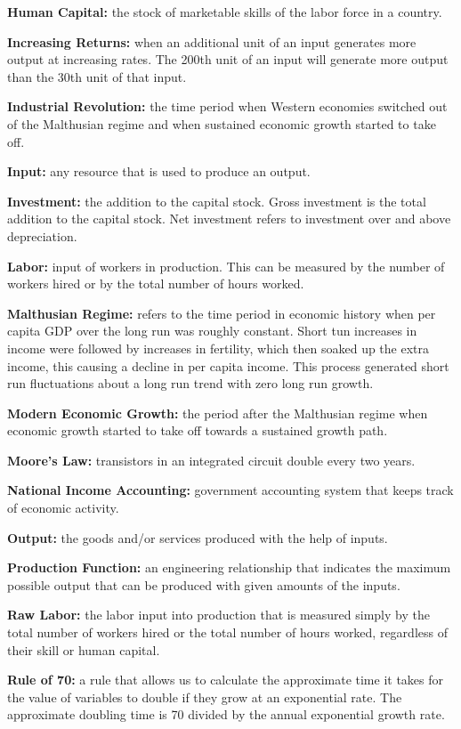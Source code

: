 \documentclass[
]{book}
\begin{document}
\textbf{Human Capital:} the stock of marketable skills of the labor force in a country.

\textbf{Increasing Returns:} when an additional unit of an input generates more output at increasing rates. The 200th unit of an input will generate more output than the 30th unit of that input.

\textbf{Industrial Revolution:} the time period when Western economies switched out of the Malthusian regime and when sustained economic growth started to take off.

\textbf{Input:} any resource that is used to produce an output.

\textbf{Investment:} the addition to the capital stock. Gross investment is the total addition to the capital stock. Net investment refers to investment over and above depreciation.

\textbf{Labor:} input of workers in production. This can be measured by the number of workers hired or by the total number of hours worked.

\textbf{Malthusian Regime:} refers to the time period in economic history when per capita GDP over the long run was roughly constant. Short tun increases in income were followed by increases in fertility, which then soaked up the extra income, this causing a decline in per capita income. This process generated short run fluctuations about a long run trend with zero long run growth.

\textbf{Modern Economic Growth:} the period after the Malthusian regime when economic growth started to take off towards a sustained growth path.

\textbf{Moore's Law:} transistors in an integrated circuit double every two years.

\textbf{National Income Accounting:} government accounting system that keeps track of economic activity.

\textbf{Output:} the goods and/or services produced with the help of inputs.

\textbf{Production Function:} an engineering relationship that indicates the maximum possible output that can be produced with given amounts of the inputs.

\textbf{Raw Labor:} the labor input into production that is measured simply by the total number of workers hired or the total number of hours worked, regardless of their skill or human capital.

\textbf{Rule of 70:} a rule that allows us to calculate the approximate time it takes for the value of variables to double if they grow at an exponential rate. The approximate doubling time is 70 divided by the annual exponential growth rate.
\end{document}
